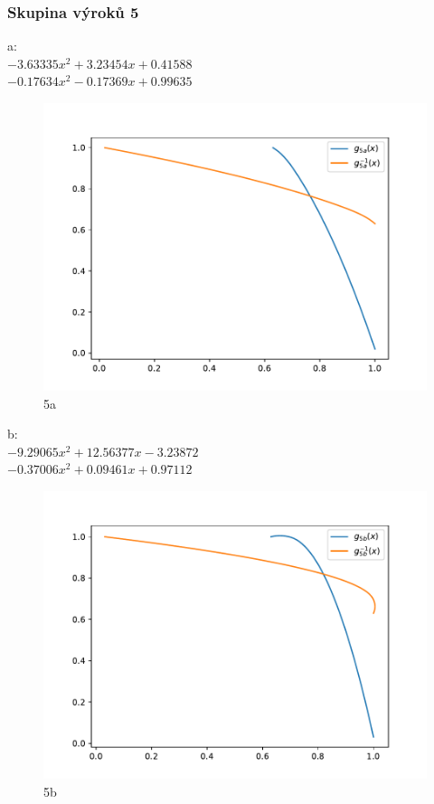 \subsubsection{Skupina výrok\r u 5}
a:\\
$-3.63335x^2+3.23454x+0.41588$\\
$-0.17634x^2-0.17369x+0.99635$\\
\begin{figure}[H]
    \caption{5a}
        \hspace{-1cm}
        \includegraphics[scale=0.5]{template-fig/p8.pdf}
        \centering
\end{figure}
b:\\
$-9.29065x^2+12.56377x-3.23872$\\
$-0.37006x^2+0.09461x+0.97112$\\
\begin{figure}[H]
    \caption{5b}
        \hspace{-1cm}
        \includegraphics[scale=0.5]{template-fig/p9.pdf}
        \centering
\end{figure}


